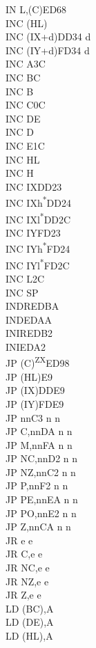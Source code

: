 \documentclass[oneside,a4paper]{book}
\begin{document}
\begin{multicols}{3}
{\begin{tabbing}
IN L,(C)\>ED68\\
INC (HL)\\
INC (IX+d)\>DD34 d\\
INC (IY+d)\>FD34 d\\
INC A\>3C\\
INC BC\\
INC B\\
INC C\>0C\\
INC DE\\
INC D\\
INC E\>1C\\
INC HL\\
INC H\\
INC IX\>DD23\\
INC IXh\textsuperscript{*}\>DD24\\
INC IXl\textsuperscript{*}\>DD2C\\
INC IY\>FD23\\
INC IYh\textsuperscript{*}\>FD24\\
INC IYl\textsuperscript{*}\>FD2C\\
INC L\>2C\\
INC SP\\
INDR\>EDBA\\
IND\>EDAA\\
INIR\>EDB2\\
INI\>EDA2\\
JP (C)\textsuperscript{ZX}\>ED98\\
JP (HL)\>E9\\
JP (IX)\>DDE9\\
JP (IY)\>FDE9\\
JP nn\>C3 n n\\
JP C,nn\>DA n n\\
JP M,nn\>FA n n\\
JP NC,nn\>D2 n n\\
JP NZ,nn\>C2 n n\\
JP P,nn\>F2 n n\\
JP PE,nn\>EA n n\\
JP PO,nn\>E2 n n\\
JP Z,nn\>CA n n\\
JR e e\\
JR C,e e\\
JR NC,e e\\
JR NZ,e e\\
JR Z,e e\\
LD (BC),A\\
LD (DE),A\\
LD (HL),A\\

\end{tabbing}}
\end{multicols}
\end{document}
